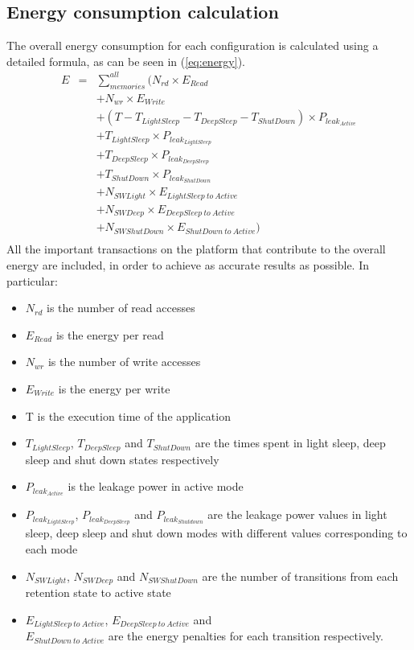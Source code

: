 \documentclass[a4paper,conference]{IEEEtran}
\begin{document}
\subsection{Energy consumption calculation}
The overall energy consumption for each configuration is calculated using a detailed formula, as can be seen in (\ref{eq:energy}). 
\setlength{\arraycolsep}{0.0em}
\begin{eqnarray}
\label{eq:energy}
 E &{}= {}&\sum\limits_{memories}^{all}  ( N_{rd} \times E_{Read} \nonumber\\
		&&+ N_{wr} \times E_{Write} \nonumber\\
		&&+ (T - T_{LightSleep} - T_{DeepSleep} - T_{ShutDown}) \times P_{leak_{Active}} \nonumber\\
		&&+ T_{LightSleep} \times P_{leak_{LightSleep}} \nonumber\\
		&&+ T_{DeepSleep} \times P_{leak_{DeepSleep}} \nonumber\\
		&&+ T_{ShutDown} \times P_{leak_{ShutDown}} \nonumber\\ 
		&& + N_{SWLight} \times E_{LightSleep \: to \: Active} \nonumber\\
		&& + N_{SWDeep} \times E_{DeepSleep \: to \: Active} \nonumber\\
		&& + N_{SWShutDown} \times E_{ShutDown \: to \: Active} ) \nonumber\\
\end{eqnarray}
\setlength{\arraycolsep}{5pt}
All the important transactions on the platform that contribute to the overall energy are included, in order to achieve as accurate results as possible. In particular:
\begin{itemize}
\item $N_{rd}$ is the number of read accesses
\item $E_{Read}$ is the energy per read
\item $N_{wr}$ is the number of write accesses 
\item $E_{Write}$ is the energy per write 
\item T is the execution time of the application
\item $T_{LightSleep}$, $T_{DeepSleep}$ and $T_{ShutDown}$ are the times spent in light sleep, deep sleep and shut down states respectively
\item $P_{leak_{Active}}$ is the leakage power in active mode 
\item $P_{leak_{LightSleep}}$, $P_{leak_{DeepSleep}}$ and $P_{leak_{Shutdown}}$ are the leakage power values in light sleep, deep sleep and shut down modes with different values corresponding to each mode 
\item $N_{SWLight}$, $N_{SWDeep}$ and $N_{SWShutDown}$ are the number of transitions from each retention state to active state
\item $E_{LightSleep \: to \: Active}$, $E_{DeepSleep \: to \: Active}$ and \\ $E_{ShutDown \: to \: Active}$  are the energy penalties for each transition respectively.
\end{itemize}
\end{document}

